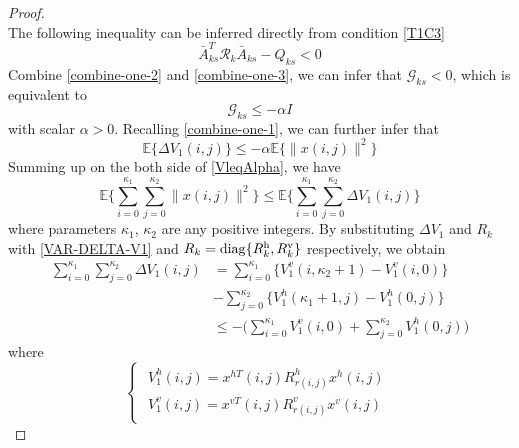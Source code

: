 \documentclass[conference]{IEEEtran}
\begin{document}
\begin{proof}
\begin{equation}
	\end{equation}
	The following inequality can be  inferred directly from condition \eqref{T1C3} 
	\begin{equation}\label{combine-one-3}
		\bar{A}^{T}_{ks}\mathcal{R}_{k}\bar{A}_{ks}-Q_{ks} < 0
	\end{equation}
	Combine \eqref{combine-one-2} and \eqref{combine-one-3}, we can infer that $\mathcal{G}_{ks}<0$, which is equivalent to 
	\begin{equation}
		\mathcal{G}_{ks} \leq -\alpha I
	\end{equation}
	with scalar $\alpha>0$.
	Recalling \eqref{combine-one-1}, we can further infer that
	\begin{equation}\label{VleqAlpha}
		\mathbb{E}\{\varDelta V_{1}(i,j) \} \leq-\alpha \mathbb{E}\{\|x(i,j)\|^{2} \}
	\end{equation}
	Summing up on the both side of \eqref{VleqAlpha}, we have
	\begin{equation}
		\mathbb{E}\Big\{\sum_{i=0}^{\kappa_{1}}\sum_{j=0}^{\kappa_{2}}  \|x(i,j)\|^{2} \Big\} \leq \mathbb{E}\Big\{\sum_{i=0}^{\kappa_{1}}\sum_{j=0}^{\kappa_{2}}  \varDelta V_{1}(i,j)  \Big\}
	\end{equation}
	where parameters $\kappa_{1}$, $\kappa_{2}$ are any positive integers. By substituting $\varDelta V_{1}$ and $R_{k}$ with \eqref{VAR-DELTA-V1} and $R_{k}=\mathrm{diag}\{R^{\rm{h}}_{k},R^{\rm{v}}_{k}\}$ respectively, we obtain
	\begin{equation}
		\begin{split}
			\sum_{i=0}^{\kappa_{1}}\sum_{j=0}^{\kappa_{2}}  \varDelta V_{1}(i,j)&= \sum_{i=0}^{\kappa_{1}}\big\{V^{v}_{1}(i,\kappa_{2}+1) - V^{v}_{1}(i,0) \big\}\\
			&-  \sum_{j=0}^{\kappa_{2}}\big\{V^{h}_{1}(\kappa_{1}+1,j) - V^{h}_{1}(0,j) \big\}\\
			&\leq -\Big(\sum_{i=0}^{\kappa_{1}}V^{v}_{1}(i,0) + \sum_{j=0}^{\kappa_{2}}V^{h}_{1}(0,j)\Big)
		\end{split}
	\end{equation}
	where 
	\begin{equation*} \label{Vhv}
	\left\{
	\begin{array}{lr}
	\begin{split}
	V^{h}_{1}(i,j)=x^{hT}(i,j)R^{h}_{r(i,j)}x^{h}(i,j)\\
	V^{v}_{1}(i,j)=x^{vT}(i,j)R^{v}_{r(i,j)}x^{v}(i,j)
	\end{split}
	\end{array}
	\right.
	\end{equation*}
	
	
	
	
\end{proof}
\end{document}

